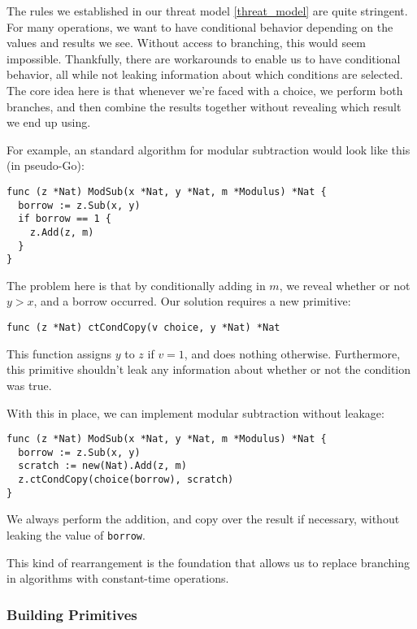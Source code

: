 \documentclass[11pt, a4paper]{article} %
\begin{document}
{The rules we established in our threat model \ref{threat_model}
are quite stringent. For many operations, we want to have conditional
behavior depending on the values and results we see. Without access
to branching, this would seem impossible. Thankfully, there are workarounds
to enable us to have conditional behavior, all while not leaking information
about which conditions are selected. The core idea here is that whenever
we're faced with a choice, we perform both branches, and then combine
the results together without revealing which result we end up using.

For example, an standard algorithm for modular subtraction would look
like this (in pseudo-Go):

\begin{verbatim}
func (z *Nat) ModSub(x *Nat, y *Nat, m *Modulus) *Nat {
  borrow := z.Sub(x, y)
  if borrow == 1 {
    z.Add(z, m)
  }
}
\end{verbatim}

The problem here is that by conditionally adding in $m$, we reveal
whether or not $y > x$, and a borrow occurred. Our solution
requires a new primitive:

\begin{verbatim}
func (z *Nat) ctCondCopy(v choice, y *Nat) *Nat
\end{verbatim}

This function assigns $y$ to $z$ if $v = 1$, and does nothing otherwise.
Furthermore, this primitive shouldn't leak any information about
whether or not the condition was true.

With this in place, we can implement modular subtraction without leakage:

\begin{verbatim}
func (z *Nat) ModSub(x *Nat, y *Nat, m *Modulus) *Nat {
  borrow := z.Sub(x, y)
  scratch := new(Nat).Add(z, m)
  z.ctCondCopy(choice(borrow), scratch)
}
\end{verbatim}

We always perform the addition, and copy over the result if necessary,
without leaking the value of \texttt{borrow}.

This kind of rearrangement is the foundation that allows us to replace
branching in algorithms with constant-time operations.

\subsubsection{Building Primitives}

}
\end{document}
